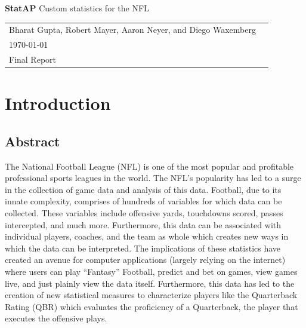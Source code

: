 \documentclass[12pt,letterpaper]{article}
\begin{document}

\newpage
\pagestyle{fancy}
\fancyhf{}
\vspace*{6cm}
\begin{center}
{\huge \bf StatAP}
\linebreak
\vspace{1cm}
\large {Custom statistics for the NFL}
\vspace{1cm}
\end{center}
\vfill
\begin{center}
\begin{tabular}{ll}
Bharat Gupta, Robert Mayer, Aaron Neyer, and Diego Waxemberg\\
\today\\
Final Report
\end{tabular}
\end{center}


\newpage
\pagestyle{fancy}
\fancyhf{}

\fancyhead[L]{\small \rm \textit{\rightmark}}
\fancyhead[R]{\small \rm \textbf{\thepage}}

\renewcommand{\sectionmark}[1]{\markright{\thesection.\ #1}}
\renewcommand{\headrulewidth}{0.5pt}
\renewcommand{\footrulewidth}{0.5pt}


\tableofcontents
\listoffigures

\newpage
\section{Introduction}

\subsection{Abstract}
The National Football League (NFL) is one of the most popular and profitable professional sports leagues in the world. The NFL’s popularity has led to a surge in the collection of game data and analysis of this data. Football, due to its innate complexity, comprises of hundreds of variables for which data can be collected. These variables include offensive yards, touchdowns scored, passes intercepted, and much more. Furthermore, this data can be associated with individual players, coaches, and the team as whole which creates new ways in which the data can be interpreted. The implications of these statistics have created an avenue for computer applications (largely relying on the internet) where users can play “Fantasy” Football, predict and bet on games, view games live, and just plainly view the data itself. Furthermore, this data has led to the creation of new statistical measures to characterize players like the Quarterback Rating (QBR) which evaluates the proficiency of a Quarterback, the player that executes the offensive plays. \\
\end{document}

